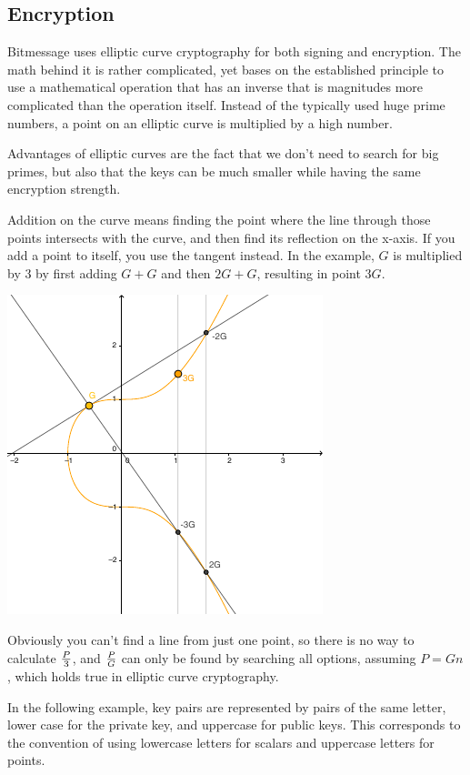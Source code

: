 \documentclass{bfh}
\begin{document}
  \subsection{Encryption}
  \label{subsec:encryption}
  Bitmessage uses elliptic curve cryptography for both signing and encryption. The math behind it is rather complicated, yet bases on the established principle to use a mathematical operation that has an inverse that is magnitudes more complicated than the operation itself. Instead of the typically used huge prime numbers, a point on an elliptic curve is multiplied by a high number.

  Advantages of elliptic curves are the fact that we don't need to search for big primes, but also that the keys can be much smaller while having the same encryption strength.

  Addition on the curve means finding the point where the line through those points intersects with the curve, and then find its reflection on the x-axis. If you add a point to itself, you use the tangent instead. In the example, $G$ is multiplied by 3 by first adding $G+G$ and then $2G+G$, resulting in point $3G$.

  \begin{center}
    \includegraphics[width=0.5 \textwidth]{images/multiplication_on_elliptic_curve.pdf}
  \end{center}

  Obviously you can't find a line from just one point, so there is no way to calculate $P \over 3$, and $P \over G$ can only be found by searching all options, assuming $P = G n$, which holds true in elliptic curve cryptography.

  In the following example, key pairs are represented by pairs of the same letter, lower case for the private key, and uppercase for public keys. This corresponds to the convention of using lowercase letters for scalars and uppercase letters for points.
\end{document}
